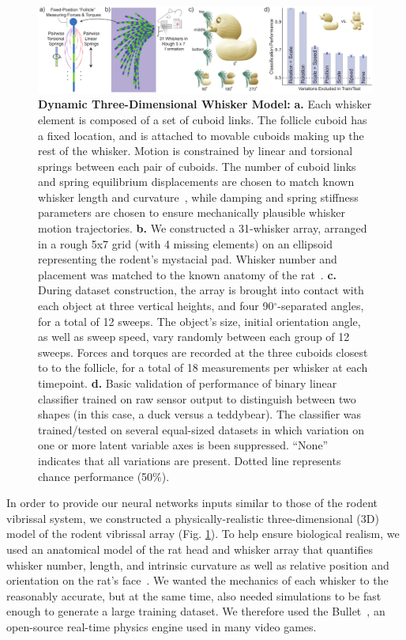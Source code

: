 \begin{figure}
\centering
\includegraphics [width=1\linewidth]{figures/whiskers.pdf}
\vspace{-3mm}
\caption{\footnotesize{\textbf{Dynamic Three-Dimensional Whisker Model:} \textbf{a.} Each whisker element is composed of a set of cuboid links. 
The follicle cuboid has a fixed location, and is attached to movable cuboids making up the rest of the whisker. 
Motion is constrained by linear and torsional springs between each pair of cuboids. 
The number of cuboid links and spring equilibrium displacements are chosen to match known whisker length and curvature~\cite{Towal2011}, while damping and spring stiffness parameters are chosen to ensure mechanically plausible whisker motion trajectories.  
\textbf{b.} We constructed a 31-whisker array, arranged in a rough 5x7 grid (with 4 missing elements) on an ellipsoid representing the rodent's mystacial pad.  Whisker number and placement was matched to the known anatomy of the rat~\cite{Towal2011}.
\textbf{c.} During dataset construction, the array is brought into contact with each object at three vertical heights, and four 90$^{\circ}$-separated angles, for a total of 12 sweeps.  
The object's size, initial orientation angle, as well as sweep speed, vary randomly between each group of 12 sweeps. 
Forces and torques are recorded at the three cuboids closest to to the follicle, for a total of 18 measurements per whisker at each timepoint. 
\textbf{d.} Basic validation of performance of binary linear classifier trained on raw sensor output to distinguish between two shapes (in this case, a duck versus a teddybear).  The classifier was trained/tested on several equal-sized datasets in which variation on one or more latent variable axes is been suppressed. ``None'' indicates that all variations are present.  Dotted line represents chance performance (50\%).}~\label{fig_whiskers}}
\vspace{-6mm}
\end{figure}

In order to provide our neural networks inputs similar to those of the rodent vibrissal system, we constructed a physically-realistic three-dimensional (3D) model of the rodent vibrissal array (Fig. \ref{fig_whiskers}).  
To help ensure biological realism, we used an anatomical model of the rat head and whisker array that quantifies whisker number, length, and intrinsic curvature as well as relative position and orientation on the rat's face~\cite{Towal2011}.
We wanted the mechanics of each whisker to the reasonably accurate, but at the same time, also needed simulations to be fast enough to generate a large training dataset.   
We therefore used the Bullet~\cite{wiki:bullet}, an open-source real-time physics engine used in many video games. 

